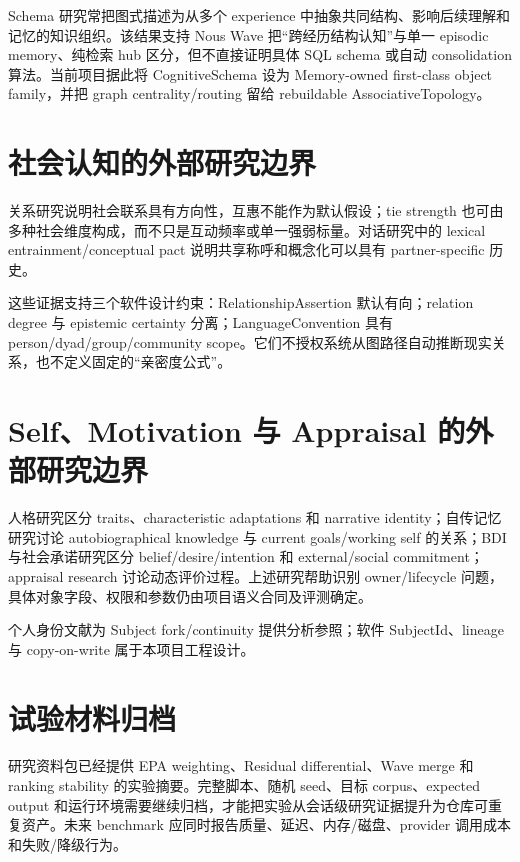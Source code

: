 Schema 研究常把图式描述为从多个 experience 中抽象共同结构、影响后续理解和记忆的知识组织。该结果支持 Nous Wave 把“跨经历结构认知”与单一 episodic memory、纯检索 hub 区分，但不直接证明具体 SQL schema 或自动 consolidation 算法。当前项目据此将 CognitiveSchema 设为 Memory-owned first-class object family，并把 graph centrality/routing 留给 rebuildable AssociativeTopology。\cite{gilboa-marlatte2017}

\section{社会认知的外部研究边界}

关系研究说明社会联系具有方向性，互惠不能作为默认假设；tie strength 也可由多种社会维度构成，而不只是互动频率或单一强弱标量。对话研究中的 lexical entrainment/conceptual pact 说明共享称呼和概念化可以具有 partner-specific 历史。\cite{almaatouq2016,aiello2022,brennan-clark1996,baldwin1992}

这些证据支持三个软件设计约束：RelationshipAssertion 默认有向；relation degree 与 epistemic certainty 分离；LanguageConvention 具有 person/dyad/group/community scope。它们不授权系统从图路径自动推断现实关系，也不定义固定的“亲密度公式”。

\section{Self、Motivation 与 Appraisal 的外部研究边界}

人格研究区分 traits、characteristic adaptations 和 narrative identity；自传记忆研究讨论 autobiographical knowledge 与 current goals/working self 的关系；BDI 与社会承诺研究区分 belief/desire/intention 和 external/social commitment；appraisal research 讨论动态评价过程。上述研究帮助识别 owner/lifecycle 问题，具体对象字段、权限和参数仍由项目语义合同及评测确定。\cite{mcadams2006,mcadamsmclean2013,conwaypleydellpearce2000,rao-georgeff1995,singh1997,singh1999,marsella-gratch2009}

个人身份文献为 Subject fork/continuity 提供分析参照；软件 SubjectId、lineage 与 copy-on-write 属于本项目工程设计。\cite{olson2023}

\section{试验材料归档}

研究资料包已经提供 EPA weighting、Residual differential、Wave merge 和 ranking stability 的实验摘要。完整脚本、随机 seed、目标 corpus、expected output 和运行环境需要继续归档，才能把实验从会话级研究证据提升为仓库可重复资产。未来 benchmark 应同时报告质量、延迟、内存/磁盘、provider 调用成本和失败/降级行为。